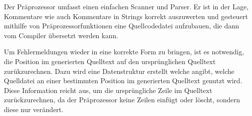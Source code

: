 Der Pr\"aprozessor umfasst einen einfachen Scanner und Parser. Er ist in der Lage, Kommentare wie auch Kommentare in Strings korrekt auszuwerten und gesteuert mithilfe von Pr\"aprozessorfunktionen eine Quellcodedatei aufzubauen, die dann vom Compiler \"ubersetzt werden kann.

Um Fehlermeldungen wieder in eine korrekte Form zu bringen, ist es notwendig, die Position im generierten Quelltext auf den urspr\"unglichen Quelltext zur\"ukzurechnen. Dazu wird eine Datenstruktur erstellt welche angibt, welche Quelldatei an einer bestimmten Position im generierten Quelltext genutzt wird. Diese Information reicht aus, um die urspr\"ungliche Zeile im Quelltext zur\"uckzurechnen, da der Pr\"aprozessor keine Zeilen einf\"ugt oder l\"oscht, sondern diese nur ver\"andert.
